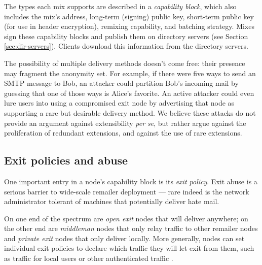 \documentclass[11pt]{IEEEtran}
\begin{document}
The types each mix supports are described in a \emph{capability block},
which also includes the mix's address, long-term (signing) public key,
short-term public key (for use in header encryption), remixing capability,
and batching strategy. Mixes sign these capability blocks
and publish them on directory servers (see Section \ref{sec:dir-servers}).
Clients download this information from the directory servers.

%

The possibility of multiple delivery methods doesn't come free: their
presence may fragment the anonymity set.  For example, if there were five
ways to send an SMTP message to Bob, an attacker could partition Bob's
incoming mail by guessing that one of those ways is Alice's favorite.
An active attacker could even lure users into using a compromised
exit node by advertising that node as supporting a
rare but desirable delivery method.
We believe these attacks do not provide an argument against
extensibility \emph{per se}, but rather argue against the proliferation
of redundant extensions, and against the use of rare extensions.  

\subsection{Exit policies and abuse}
\label{subsec:exitpolicies}

One important entry in a node's capability block is its \emph{exit
policy}. Exit abuse is a serious barrier to wide-scale remailer deployment
--- rare indeed is the network administrator tolerant of machines that
potentially deliver hate mail. %

On one end of the spectrum are \emph{open exit} nodes that will
deliver anywhere; on the other end are \emph{middleman} nodes that
only relay traffic to other remailer nodes and \emph{private exit}
nodes that only deliver locally. More generally, nodes can set
individual exit policies to declare which traffic they will let exit
from them, such as traffic for local users or other authenticated
traffic \cite{onion-discex00}.
\end{document}
